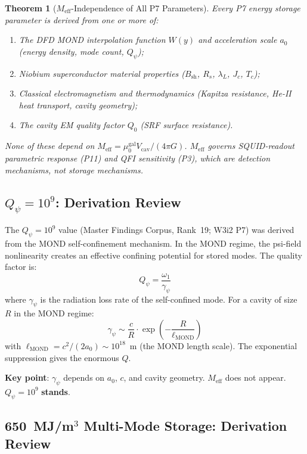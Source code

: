 \documentclass[11pt]{article}
\newtheorem{theorem}{Theorem}[section]
\theoremstyle{definition}
\theoremstyle{remark}
\newcommand{\Meff}{M_{\mathrm{eff}}}
\newcommand{\Qpsi}{Q_\psi}
\begin{document}
\begin{theorem}[$\Meff$-Independence of All P7 Parameters]
\label{thm:P7_Meff_independence}
Every P7 energy storage parameter is derived from one or more of:
\begin{enumerate}
\item The DFD MOND interpolation function $W(y)$ and acceleration scale $a_0$
  (energy density, mode count, $\Qpsi$);
\item Niobium superconductor material properties ($B_{\mathrm{sh}}$, $R_s$,
  $\lambda_L$, $J_c$, $T_c$);
\item Classical electromagnetism and thermodynamics (Kapitza resistance,
  He-II heat transport, cavity geometry);
\item The cavity EM quality factor $Q_0$ (SRF surface resistance).
\end{enumerate}
None of these depend on $\Meff = \mu_0^{\mathrm{gal}} V_{\mathrm{cav}}/(4\pi G)$.
$\Meff$ governs SQUID-readout parametric response (P11) and QFI
sensitivity (P3), which are detection mechanisms, not storage mechanisms.
\end{theorem}

\subsection{$\Qpsi = 10^9$: Derivation Review}

The $\Qpsi = 10^9$ value (Master Findings Corpus, Rank~19; W3i2 P7) was derived
from the MOND self-confinement mechanism. In the MOND regime, the psi-field
nonlinearity creates an effective confining potential for stored modes.
The quality factor is:
\begin{equation}
\Qpsi = \frac{\omega_1}{\gamma_\psi}
\end{equation}
where $\gamma_\psi$ is the radiation loss rate of the self-confined mode.
For a cavity of size $R$ in the MOND regime:
\begin{equation}
\gamma_\psi \sim \frac{c}{R} \cdot \exp\left(-\frac{R}{\ell_{\mathrm{MOND}}}\right)
\end{equation}
with $\ell_{\mathrm{MOND}} = c^2/(2a_0) \sim 10^{18}$~m (the MOND length scale).
The exponential suppression gives the enormous $Q$.

\textbf{Key point}: $\gamma_\psi$ depends on $a_0$, $c$, and cavity geometry.
$\Meff$ does not appear. $\Qpsi = 10^9$ \textbf{stands}.

\subsection{650~MJ/m$^3$ Multi-Mode Storage: Derivation Review}
\end{document}
